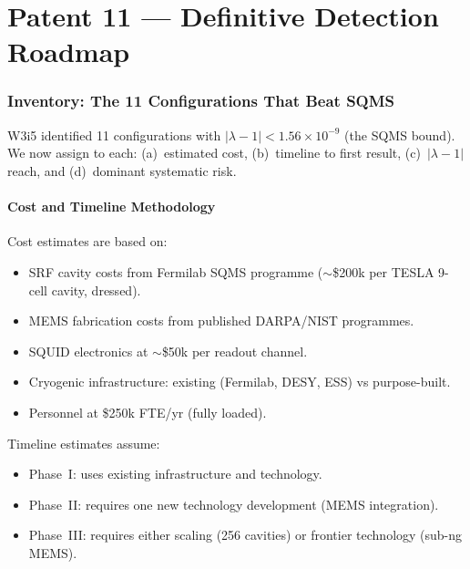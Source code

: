 \documentclass[11pt]{article}
\theoremstyle{definition}
\theoremstyle{remark}
\newcommand{\ee}[1]{\times 10^{#1}}
\newcommand{\lamdiff}{|\lambda-1|}
\begin{document}

\newpage
\part{Patent 11 --- Definitive Detection Roadmap}

\section{Inventory: The 11 Configurations That Beat SQMS}
\label{sec:inventory}

W3i5 identified 11 configurations with $\lamdiff < 1.56\ee{-9}$ (the
SQMS bound). We now assign to each: (a)~estimated cost, (b)~timeline
to first result, (c)~$\lamdiff$ reach, and (d)~dominant systematic risk.

\subsection{Cost and Timeline Methodology}

Cost estimates are based on:
\begin{itemize}[nosep]
\item SRF cavity costs from Fermilab SQMS programme ($\sim$\$200k per
  TESLA 9-cell cavity, dressed).
\item MEMS fabrication costs from published DARPA/NIST programmes.
\item SQUID electronics at $\sim$\$50k per readout channel.
\item Cryogenic infrastructure: existing (Fermilab, DESY, ESS) vs
  purpose-built.
\item Personnel at \$250k FTE/yr (fully loaded).
\end{itemize}

Timeline estimates assume:
\begin{itemize}[nosep]
\item Phase~I: uses existing infrastructure and technology.
\item Phase~II: requires one new technology development (MEMS integration).
\item Phase~III: requires either scaling (256 cavities) or frontier
  technology (sub-ng MEMS).
\end{itemize}
\end{document}

